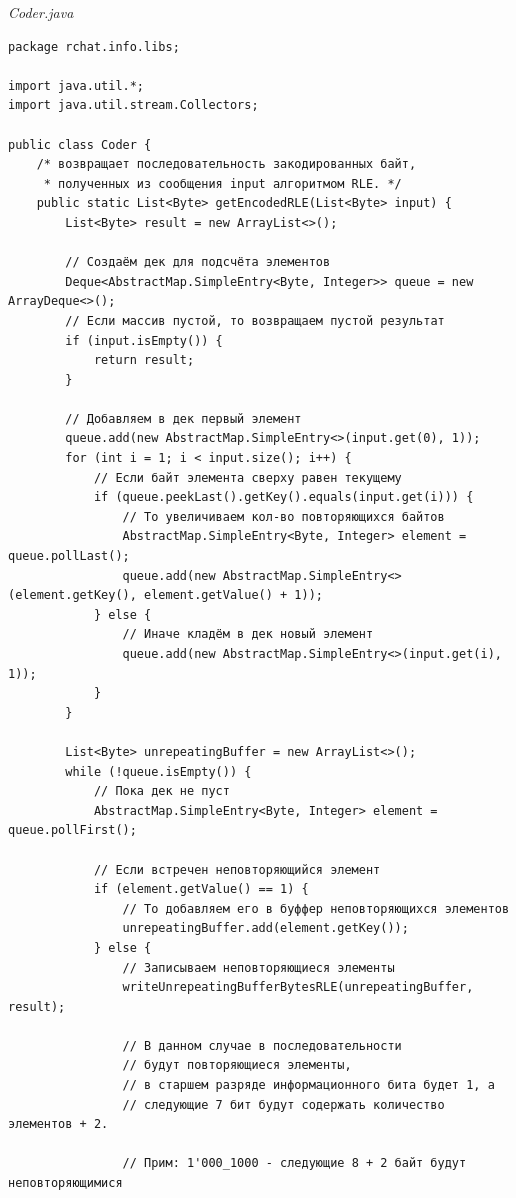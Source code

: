 \documentclass[a4paper,14pt]{extarticle}
\begin{document}
\textit{Coder.java}
\begin{verbatim}
package rchat.info.libs;

import java.util.*;
import java.util.stream.Collectors;

public class Coder {
    /* возвращает последовательность закодированных байт,
     * полученных из сообщения input алгоритмом RLE. */
    public static List<Byte> getEncodedRLE(List<Byte> input) {
        List<Byte> result = new ArrayList<>();

        // Создаём дек для подсчёта элементов
        Deque<AbstractMap.SimpleEntry<Byte, Integer>> queue = new ArrayDeque<>();
        // Если массив пустой, то возвращаем пустой результат
        if (input.isEmpty()) {
            return result;
        }

        // Добавляем в дек первый элемент
        queue.add(new AbstractMap.SimpleEntry<>(input.get(0), 1));
        for (int i = 1; i < input.size(); i++) {
            // Если байт элемента сверху равен текущему
            if (queue.peekLast().getKey().equals(input.get(i))) {
                // То увеличиваем кол-во повторяющихся байтов
                AbstractMap.SimpleEntry<Byte, Integer> element = queue.pollLast();
                queue.add(new AbstractMap.SimpleEntry<>(element.getKey(), element.getValue() + 1));
            } else {
                // Иначе кладём в дек новый элемент
                queue.add(new AbstractMap.SimpleEntry<>(input.get(i), 1));
            }
        }

        List<Byte> unrepeatingBuffer = new ArrayList<>();
        while (!queue.isEmpty()) {
            // Пока дек не пуст
            AbstractMap.SimpleEntry<Byte, Integer> element = queue.pollFirst();

            // Если встречен неповторяющийся элемент
            if (element.getValue() == 1) {
                // То добавляем его в буффер неповторяющихся элементов
                unrepeatingBuffer.add(element.getKey());
            } else {
                // Записываем неповторяющиеся элементы
                writeUnrepeatingBufferBytesRLE(unrepeatingBuffer, result);

                // В данном случае в последовательности
                // будут повторяющиеся элементы,
                // в старшем разряде информационного бита будет 1, а
                // следующие 7 бит будут содержать количество элементов + 2.

                // Прим: 1'000_1000 - следующие 8 + 2 байт будут неповторяющимися



\end{verbatim}
\end{document}
